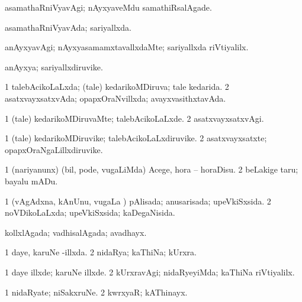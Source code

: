 {{\bentry
{} 
\gl{\kirxvi}
\expl{}
\bmng
asamathaRniVyavAgi; nAyxyaveMdu samathiRsalAgade. 
\emng
\eentry

\bentry
{} 
\gl{\gu}
\expl{}
\bmng
asamathaRniVyavAda; sariyallxda. 
\emng
\eentry

\bentry
{} 
\gl{\kirxvi}
\expl{}
\bmng
anAyxyavAgi; nAyxyasamamxtavallxdaMte; sariyallxda riVtiyalilx. 
\emng
\eentry

\bentry
{} 
\gl{\nA}
\expl{}
\bmng
anAyxya; sariyallxdiruvike. 
\emng
\eentry

\bentry
{} 
\gl{\gu}
\expl{}
\bmng
\bnum
\num{1} talebAcikoLaLxda; (tale) kedarikoMDiruva; tale kedarida. 
\num{2} asatxvayxsatxvAda; opapxOraNvillxda; avayxvasithxtavAda. 
\enum
\emng
\eentry

\bentry
{} 
\gl{\kirxvi}
\expl{}
\bmng
\bnum
\num{1} (tale) kedarikoMDiruvaMte; talebAcikoLaLxde. 
\num{2} asatxvayxsatxvAgi. 
\enum
\emng
\eentry

\bentry
{} 
\gl{\nA}
\expl{}
\bmng
\bnum
\num{1} (tale) kedarikoMDiruvike; talebAcikoLaLxdiruvike. 
\num{2} asatxvayxsatxte; opapxOraNgaLillxdiruvike. 
\enum
\emng
\eentry

\bentry
{} 
\gl{\sakirx}
\expl{}
\bmng
\bnum
\num{1} (nariyanunx) (bil, pode, \mo vugaLiMda) Acege, hora -- horaDisu. 
\num{2} beLakige taru; bayalu mADu. 
\enum
\emng
\eentry

\bentry
{} 
\gl{\gu}
\expl{}
\bmng
\bnum
\num{1} (vAgAdxna, kAnUnu, \mo vugaLa \vi) pAlisada; anusarisada; upeVkiSxsida. 
\num{2} noVDikoLaLxda; upeVkiSxsida; kaDegaNisida. 
\enum
\emng
\eentry

\bentry
{} 
\gl{\gu}
\expl{}
\bmng
kollxlAgada; vadhisalAgada; avadhayx. 
\emng
\eentry

\bentry
{} 
\gl{\gu}
\expl{}
\bmng
\bnum
\num{1} daye, karuNe -illxda. 
\num{2} nidaRya; kaThiNa; kUrxra. 
\enum
\emng
\eentry

\bentry
{} 
\gl{\kirxvi}
\expl{}
\bmng
\bnum
\num{1} daye illxde; karuNe illxde. 
\num{2} kUrxravAgi; nidaRyeyiMda; kaThiNa riVtiyalilx. 
\enum
\emng
\eentry

\bentry
{} 
\gl{\nA}
\expl{}
\bmng
\bnum
\num{1} nidaRyate; niSakxruNe. 
\num{2} kwrxyaR; kAThinayx. 
\enum
\emng
\eentry

}}
